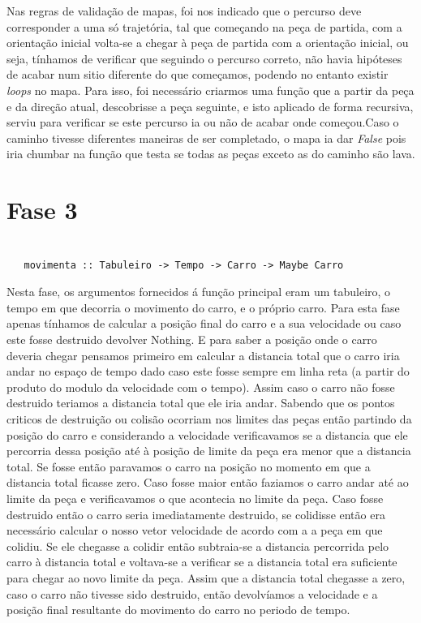\documentclass[a4paper]{report} %
\begin{document}
    Nas regras de validação de mapas, foi nos indicado que o percurso deve corresponder a uma só trajetória, tal que começando na peça de partida, com a orientação inicial volta-se a chegar à peça de partida com a orientação inicial, ou seja, tínhamos de verificar que seguindo o percurso correto, não havia hipóteses de acabar num sitio diferente do que começamos, podendo no entanto existir \textit{loops} no mapa.
    Para isso, foi necessário criarmos uma função que a partir da peça e da direção atual, descobrisse a peça seguinte, e isto aplicado de forma recursiva, serviu para verificar se este percurso ia ou não de acabar onde começou.Caso o caminho tivesse diferentes maneiras de ser completado, o mapa ia dar \textit{False} pois iria chumbar na função que testa se todas as peças exceto as do caminho são lava. 
    
   


\section{Fase 3}

 \begin{verbatim}

   movimenta :: Tabuleiro -> Tempo -> Carro -> Maybe Carro

\end{verbatim}

Nesta fase, os argumentos fornecidos á função principal eram um tabuleiro,  o tempo em que decorria o movimento do carro, e o próprio carro.
Para esta fase apenas tínhamos de calcular a posição final do carro e a sua velocidade ou caso este fosse destruido devolver Nothing. E para saber a posição onde o carro deveria chegar pensamos primeiro em calcular a distancia total que o carro iria andar no espaço de tempo dado caso este fosse sempre em linha reta (a partir do produto do modulo da velocidade com o tempo). Assim caso o carro não fosse destruido teriamos a distancia total que ele iria andar. Sabendo que os pontos criticos de destruição ou colisão ocorriam nos limites das peças então partindo da posição do carro e considerando a velocidade verificavamos se a distancia que ele percorria dessa posição até à posição de limite da peça era menor que a distancia total. Se fosse então paravamos o carro na posição no momento em que a distancia total ficasse zero. Caso fosse maior então faziamos o carro andar até ao limite da peça e verificavamos o que acontecia no limite da peça. Caso fosse destruido então o carro seria imediatamente destruido, se colidisse então era necessário calcular o nosso vetor velocidade de acordo com a a peça em que colidiu. Se ele chegasse a colidir então subtraia-se a distancia percorrida pelo carro à distancia total e voltava-se a verificar se a distancia total era suficiente para chegar ao novo limite da peça. Assim que a distancia total chegasse a zero, caso o carro não tivesse sido destruido, então devolvíamos a velocidade e a posição final resultante do movimento do carro no periodo de tempo.    
\end{document}
